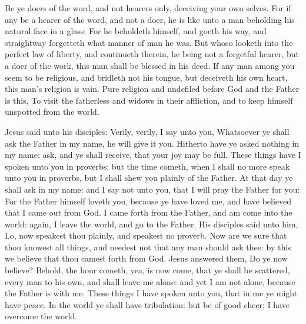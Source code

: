  Be ye doers of the word, and not hearers only, deceiving your own selves. For if any be a hearer of the word, and not a doer, he is like unto a man beholding his natural face in a glass: For he beholdeth himself, and goeth his way, and straightway forgetteth what manner of man he was. But whoso looketh into the perfect law of liberty, and continueth therein, he being not a forgetful hearer, but a doer of the work, this man shall be blessed in his deed. If any man among you seem to be religious, and bridleth not his tongue, but deceiveth his own heart, this man's religion is vain. Pure religion and undefiled before God and the Father is this, To visit the fatherless and widows in their affliction, and to keep himself unspotted from the world.


 Jesus said unto his disciples: Verily, verily, I say unto you, Whatsoever ye shall ask the Father in my name, he will give it you. Hitherto have ye asked nothing in my name: ask, and ye shall receive, that your joy may be full. These things have I spoken unto you in proverbs: but the time cometh, when I shall no more speak unto you in proverbs, but I shall shew you plainly of the Father. At that day ye shall ask in my name: and I say not unto you, that I will pray the Father for you: For the Father himself loveth you, because ye have loved me, and have believed that I came out from God. I came forth from the Father, and am come into the world: again, I leave the world, and go to the Father. His disciples said unto him, Lo, now speakest thou plainly, and speakest no proverb. Now are we sure that thou knowest all things, and needest not that any man should ask thee: by this we believe that thou camest forth from God. Jesus answered them, Do ye now believe? Behold, the hour cometh, yea, is now come, that ye shall be scattered, every man to his own, and shall leave me alone: and yet I am not alone, because the Father is with me. These things I have spoken unto you, that in me ye might have peace. In the world ye shall have tribulation: but be of good cheer; I have overcome the world.

\clearpage
{}

